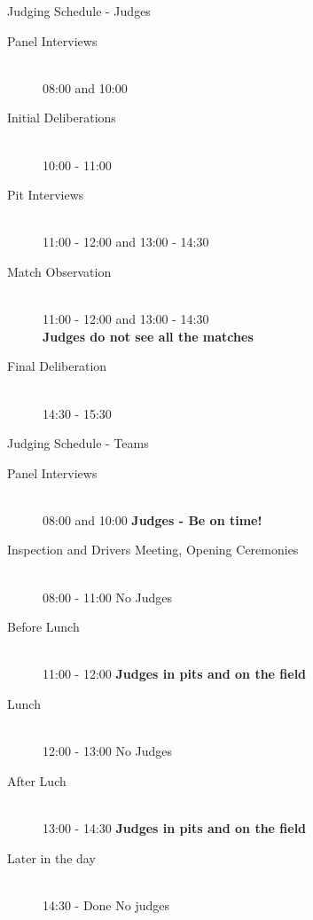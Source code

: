 \documentclass{beamer}
\begin{document}
  \begin{frame}{Judging Schedule - Judges}
    \begin{description}
    \item[Panel Interviews] \hfill \\ 08:00 and 10:00
    \item[Initial Deliberations] \hfill \\ 10:00 - 11:00
    \item[Pit Interviews] \hfill  \\ 11:00 - 12:00 and 13:00 - 14:30
    \item[Match Observation] \hfill \\ 11:00 - 12:00 and 13:00 - 14:30 \\
      \textbf{Judges do not see all the matches}
    \item[Final Deliberation] \hfill \\ 14:30 - 15:30
    \end{description}
  \end{frame}

  \begin{frame}{Judging Schedule - Teams}
    \begin{description}
    \item[Panel Interviews] \hfill
      \\ 08:00 and 10:00 \textbf{Judges - Be on time!}
    \item[Inspection and Drivers Meeting, Opening Ceremonies] \hfill \\
      08:00 - 11:00 No Judges
    \item[Before Lunch] \hfill \\
      11:00 - 12:00 \textbf{Judges in pits and on the field}
    \item[Lunch] \hfill \\
      12:00 - 13:00 No Judges
    \item[After Luch] \hfill \\
      13:00 - 14:30 \textbf{Judges in pits and on the field}
    \item[Later in the day] \hfill \\
      14:30 - Done No judges
    \end{description}
  \end{frame}
\end{document}
